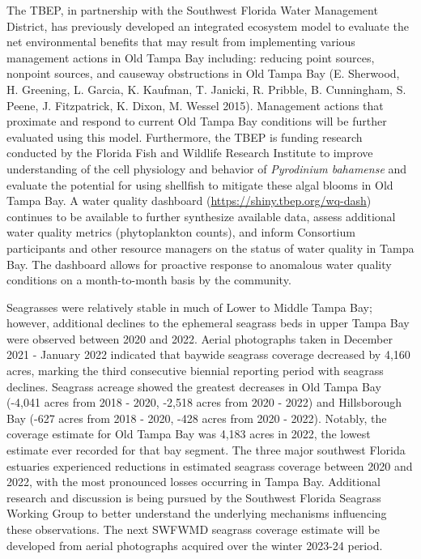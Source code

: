 \documentclass[
  letterpaper,
  DIV=11,
  numbers=noendperiod]{scrreprt}
\begin{document}
The TBEP, in partnership with the Southwest Florida Water Management
District, has previously developed an integrated ecosystem model to
evaluate the net environmental benefits that may result from
implementing various management actions in Old Tampa Bay including:
reducing point sources, nonpoint sources, and causeway obstructions in
Old Tampa Bay (E. Sherwood, H. Greening, L. Garcia, K. Kaufman, T.
Janicki, R. Pribble, B. Cunningham, S. Peene, J. Fitzpatrick, K. Dixon,
M. Wessel 2015). Management actions that proximate and respond to
current Old Tampa Bay conditions will be further evaluated using this
model. Furthermore, the TBEP is funding research conducted by the
Florida Fish and Wildlife Research Institute to improve understanding of
the cell physiology and behavior of \emph{Pyrodinium bahamense} and
evaluate the potential for using shellfish to mitigate these algal
blooms in Old Tampa Bay. A water quality dashboard
(\url{https://shiny.tbep.org/wq-dash}) continues to be available to
further synthesize available data, assess additional water quality
metrics (phytoplankton counts), and inform Consortium participants and
other resource managers on the status of water quality in Tampa Bay. The
dashboard allows for proactive response to anomalous water quality
conditions on a month-to-month basis by the community.

Seagrasses were relatively stable in much of Lower to Middle Tampa Bay;
however, additional declines to the ephemeral seagrass beds in upper
Tampa Bay were observed between 2020 and 2022. Aerial photographs taken
in December 2021 - January 2022 indicated that baywide seagrass coverage
decreased by 4,160 acres, marking the third consecutive biennial
reporting period with seagrass declines. Seagrass acreage showed the
greatest decreases in Old Tampa Bay (-4,041 acres from 2018 - 2020,
-2,518 acres from 2020 - 2022) and Hillsborough Bay (-627 acres from
2018 - 2020, -428 acres from 2020 - 2022). Notably, the coverage
estimate for Old Tampa Bay was 4,183 acres in 2022, the lowest estimate
ever recorded for that bay segment. The three major southwest Florida
estuaries experienced reductions in estimated seagrass coverage between
2020 and 2022, with the most pronounced losses occurring in Tampa Bay.
Additional research and discussion is being pursued by the Southwest
Florida Seagrass Working Group to better understand the underlying
mechanisms influencing these observations. The next SWFWMD seagrass
coverage estimate will be developed from aerial photographs acquired
over the winter 2023-24 period.
\end{document}
